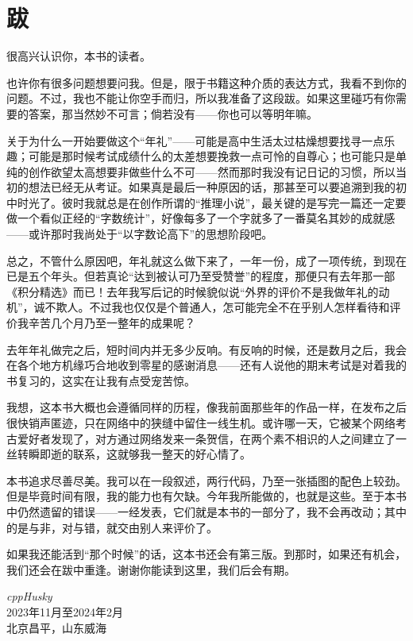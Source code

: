 \chapter*{跋}
很高兴认识你，本书的读者。\par
也许你有很多问题想要问我。但是，限于书籍这种介质的表达方式，我看不到你的问题。不过，我也不能让你空手而归，所以我准备了这段跋。如果这里碰巧有你需要的答案，那当然妙不可言；倘若没有——你也可以等明年嘛。\par
关于为什么一开始要做这个``年礼''——可能是高中生活太过枯燥想要找寻一点乐趣；可能是那时候考试成绩什么的太差想要挽救一点可怜的自尊心；也可能只是单纯的创作欲望太高想要非做些什么不可——然而那时我没有记日记的习惯，所以当初的想法已经无从考证。如果真是最后一种原因的话，那甚至可以要追溯到我的初中时光了。彼时我就总是在创作所谓的``推理小说''，最关键的是写完一篇还一定要做一个看似正经的``字数统计''，好像每多了一个字就多了一番莫名其妙的成就感——或许那时我尚处于``以字数论高下''的思想阶段吧。\par
总之，不管什么原因吧，年礼就这么做下来了，一年一份，成了一项传统，到现在已是五个年头。但若真论``达到被认可乃至受赞誉''的程度，那便只有去年那一部《积分精选》而已！去年我写后记的时候貌似说``外界的评价不是我做年礼的动机''，诚不欺人。不过我也仅仅是个普通人，怎可能完全不在乎别人怎样看待和评价我辛苦几个月乃至一整年的成果呢？\par
去年年礼做完之后，短时间内并无多少反响。有反响的时候，还是数月之后，我会在各个地方机缘巧合地收到零星的感谢消息——还有人说他的期末考试是对着我的书复习的，这实在让我有点受宠苦惊。\par
我想，这本书大概也会遵循同样的历程，像我前面那些年的作品一样，在发布之后很快销声匿迹，只在网络中的狭缝中留住一线生机。或许哪一天，它被某个网络考古爱好者发现了，对方通过网络发来一条贺信，在两个素不相识的人之间建立了一丝转瞬即逝的联系，这就够我一整天的好心情了。\par
本书追求尽善尽美。我可以在一段叙述，两行代码，乃至一张插图的配色上较劲。但是毕竟时间有限，我的能力也有欠缺。今年我所能做的，也就是这些。至于本书中仍然遗留的错误——一经发表，它们就是本书的一部分了，我不会再改动；其中的是与非，对与错，就交由别人来评价了。\par
如果我还能活到``那个时候''的话，这本书还会有第三版。到那时，如果还有机会，我们还会在跋中重逢。谢谢你能读到这里，我们后会有期。\par
\begin{flushright}
\textit{cppHusky}\\
2023年11月至2024年2月\\
北京昌平，山东威海
\end{flushright}
